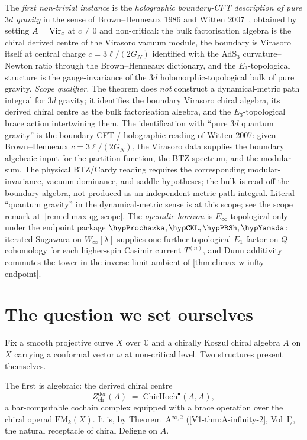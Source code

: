 The \emph{first non-trivial instance} is the
\emph{holographic boundary-CFT description of pure $3d$
gravity} in the sense of Brown--Henneaux 1986
\cite{BrownHenneaux} and Witten 2007~\cite{Witten2007},
obtained by setting $A = \mathrm{Vir}_{c}$ at $c \neq 0$ and
non-critical: the bulk factorisation algebra is the chiral
derived centre of the Virasoro vacuum module, the boundary is
Virasoro itself at central charge $c = 3\ell/(2G_{N})$
identified with the AdS$_{3}$ curvature--Newton ratio through
the Brown--Henneaux dictionary, and the $E_{3}$-topological
structure is the gauge-invariance of the
$3d$ holomorphic-topological bulk of pure gravity.
\emph{Scope qualifier.} The theorem does \emph{not} construct
a dynamical-metric path integral for $3d$ gravity; it
identifies the boundary Virasoro chiral algebra, its derived
chiral centre as the bulk factorisation algebra, and the
$E_{3}$-topological brace action intertwining them. The
identification with ``pure $3d$ quantum gravity'' is the
boundary-CFT / holographic reading of Witten 2007: given
Brown--Henneaux $c = 3\ell/(2G_{N})$, the Virasoro data supplies
the boundary algebraic input for the partition function, the BTZ
spectrum, and the modular sum. The physical BTZ/Cardy reading
requires the corresponding modular-invariance, vacuum-dominance, and
saddle hypotheses; the bulk is read off the boundary algebra, not
produced as an independent metric path integral. Literal
``quantum gravity'' in the dynamical-metric sense is
\ClaimStatusConjectured at this scope; see the scope remark
	at~\cref{rem:climax-qg-scope}. The \emph{operadic horizon} is
	$E_{\infty}$-topological only under the endpoint package
	\(\hypProchazka,\hypCKL,\hypPRSh,\hypYamada\): iterated Sugawara on
	$W_{\infty}[\lambda]$ supplies one further topological $E_{1}$ factor
	on $Q$-cohomology for each higher-spin Casimir current \(T^{(n)}\),
	and Dunn additivity commutes the tower in the inverse-limit ambient of
	\cref{thm:climax-w-infty-endpoint}.

\section{The question we set ourselves}
\label{sec:climax-question}

Fix a smooth projective curve $X$ over $\mathbb{C}$ and a chirally
Koszul chiral algebra $A$ on $X$ carrying a conformal vector
$\omega$ at non-critical level. Two structures present themselves.

The first is algebraic: the derived chiral centre
\[
 Z^{\mathrm{der}}_{\mathrm{ch}}(A) \;=\; \mathrm{ChirHoch}^{\bullet}(A, A),
\]
a bar-computable cochain complex equipped with a brace operation
over the chiral operad $\mathrm{FM}_{k}(X)$. It is, by
Theorem~A$^{\infty,2}$ (\cref{V1-thm:A-infinity-2}, Vol~I), the
natural receptacle of chiral Deligne on $A$.

